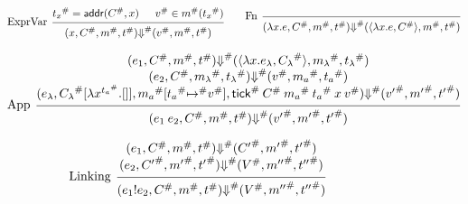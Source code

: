 \documentclass[acmsmall,screen,review]{acmart}
\theoremstyle{definition}
\newcommand*{\A}[1]{{#1}^{\#}}
\newcommand*{\mem}{m}
\newcommand*{\link}[2]{{#1}\mathtt{!}{#2}}
\newcommand*{\addr}{\mathsf{addr}}
\newcommand*{\tick}{\mathsf{tick}}
\begin{document}
\begin{figure}[htb]
  \begin{flushright}\fbox{$(e,\A{C},\A\mem,\A{t})\A\Downarrow(\A{V},\A{\mem'},\A{t'})$}\end{flushright}
  \footnotesize
  \[
    \begin{prooftree}
      \hypo{\A{t_{x}}=\addr(\A{C},x)}
      \hypo{\A{v}\in\A{\mem}(\A{t_{x}})}
      \infer[left label=ExprVar]2{
      (x, \A{C}, \A{\mem}, \A{t})
      \A{\Downarrow}
      (\A{v}, \A{\mem}, \A{t})
      }
    \end{prooftree}\qquad
    \begin{prooftree}
      \infer[left label=Fn]0{
      (\lambda x.e, \A{C}, \A{\mem}, \A{t})
      \A{\Downarrow}
      (\langle\lambda x.e, \A{C}\rangle, \A{\mem}, \A{t})
      }
    \end{prooftree}
  \]

  \[
    \begin{prooftree}
      \hypo{
        \begin{matrix}
          (e_{1}, \A{C}, \A{\mem}, \A{t})
          \A{\Downarrow}
          (\langle\lambda x.e_{\lambda}, \A{C_{\lambda}}\rangle, \A{\mem_{\lambda}}, \A{t_{\lambda}}) \\
          (e_{2}, \A{C}, \A{\mem_{\lambda}}, \A{t_{\lambda}})
          \A{\Downarrow}
          (\A{v}, \A{\mem_{a}}, \A{t_{a}})                                                            \\
          (e_{\lambda}, \A{C_{\lambda}}[\lambda x^{\A{t_{a}}}.[]], \A{\mem_{a}}[\A{t_{a}}\A{\mapsto} \A{v}], \A{\tick}\:\A{C}\:\A{\mem_a}\:\A{t_{a}}\:x\:\A{v})
          \A{\Downarrow}
          (\A{v'}, \A{\mem'},\A{t'})
        \end{matrix}
      }
      \infer[left label={App}]1{
      (e_{1}\:e_{2}, \A{C}, \A{\mem}, \A{t})
      \A{\Downarrow}
      (\A{v'}, \A{\mem'},\A{t'})
      }
    \end{prooftree}
  \]

  \[
    \begin{prooftree}
      \hypo{
        \begin{matrix}
          (e_{1}, \A{C}, \A{\mem}, \A{t})
          \A{\Downarrow}
          (\A{C'}, \A{\mem'}, \A{t'}) \\
          (e_{2}, \A{C'}, \A{\mem'}, \A{t'})
          \A{\Downarrow}
          (\A{V}, \A{\mem''}, \A{t''})
        \end{matrix}
      }
      \infer[left label=Linking]1{
      (\link{e_{1}}{e_{2}}, \A{C}, \A{\mem}, \A{t})
      \A\Downarrow
      (\A{V}, \A{\mem''}, \A{t''})
      }
    \end{prooftree}
  \]


\end{figure}
\end{document}
